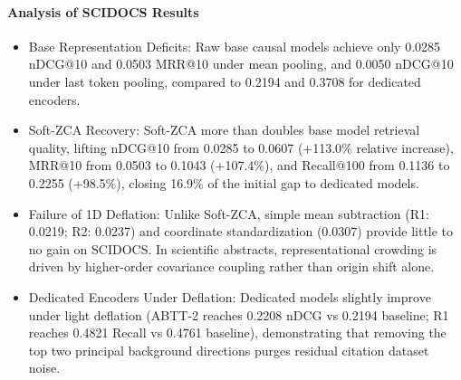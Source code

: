 \paragraph{Analysis of SCIDOCS Results}
\begin{itemize}
\item Base Representation Deficits: Raw base causal models achieve only 0.0285 nDCG@10 and 0.0503 MRR@10 under mean pooling, and 0.0050 nDCG@10 under last token pooling, compared to 0.2194 and 0.3708 for dedicated encoders.
\item Soft-ZCA Recovery: Soft-ZCA more than doubles base model retrieval quality, lifting nDCG@10 from 0.0285 to 0.0607 (+113.0\% relative increase), MRR@10 from 0.0503 to 0.1043 (+107.4\%), and Recall@100 from 0.1136 to 0.2255 (+98.5\%), closing 16.9\% of the initial gap to dedicated models.
\item Failure of 1D Deflation: Unlike Soft-ZCA, simple mean subtraction (R1: 0.0219; R2: 0.0237) and coordinate standardization (0.0307) provide little to no gain on SCIDOCS. In scientific abstracts, representational crowding is driven by higher-order covariance coupling rather than origin shift alone.
\item Dedicated Encoders Under Deflation: Dedicated models slightly improve under light deflation (ABTT-2 reaches 0.2208 nDCG vs 0.2194 baseline; R1 reaches 0.4821 Recall vs 0.4761 baseline), demonstrating that removing the top two principal background directions purges residual citation dataset noise.
\end{itemize}

